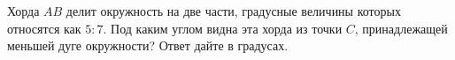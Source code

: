 \begin{ex}
	\begin{condition}
		Хорда \( AB \)  делит окружность на две части, градусные величины которых относятся как \( 5:7 \). Под каким углом видна эта хорда из точки \( C \), принадлежащей меньшей дуге окружности? Ответ дайте в градусах.
	\end{condition}
\end{ex}